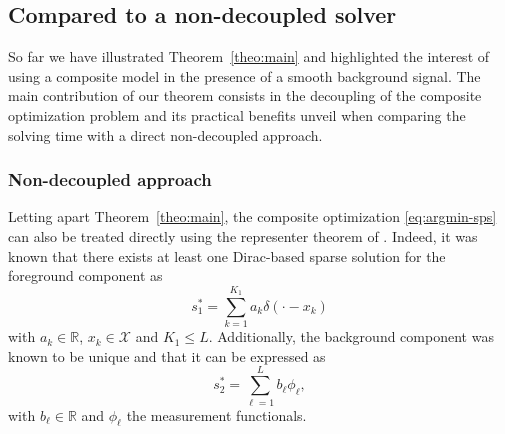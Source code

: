     \subsection{Compared to a non-decoupled solver}
    \label{sec:bene:deco}
        So far we have illustrated Theorem~\ref{theo:main} and highlighted the interest of using a composite model in the presence of a smooth background signal. The main contribution of our theorem consists in the decoupling of the composite optimization problem and its practical benefits unveil when comparing the solving time with a direct non-decoupled approach. 

        \subsubsection{Non-decoupled approach}
        Letting apart Theorem~\ref{theo:main}, the composite optimization \eqref{eq:argmin-sps} can also be treated directly using the representer theorem of \cite{debarre2021continuous}. Indeed, it was known that there exists at least one Dirac-based sparse solution for the foreground component as
        \begin{equation}
            s_1^* = \sum_{k=1}^{K_1} a_{k} \delta(\cdot - x_k)
            \label{eq:rt-deb-1}
        \end{equation}
        with $a_{k} \in \mathbb{R}$, $x_k \in \mathcal{X}$ and $K_1 \leq L$.
        Additionally, the background component was known to be unique and that it can be expressed as
        \begin{equation}
            s_2^* = \sum_{\ell=1}^{L} b_{\ell} \phi_\ell,
            \label{eq:rt-deb-2}
        \end{equation}
        with $b_\ell \in \mathbb{R}$ and $\phi_\ell$ the measurement functionals.

